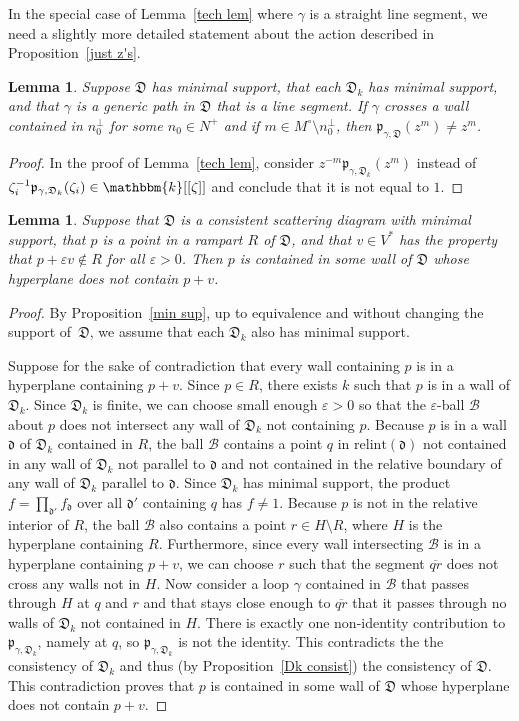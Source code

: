 \documentclass{amsart}
\newtheorem{lemma}[proposition]{Lemma}
\theoremstyle{definition}
\theoremstyle{remark}
\numberwithin{equation}{section}
\newcommand{\ep}{\varepsilon}
\newcommand{\D}{{\mathfrak D}}
\newcommand{\p}{{\mathfrak p}}
\newcommand{\0}{{\mathbf{0}}}
\newcommand{\relint}{\mathrm{relint}}
\renewcommand{\k}{\mathbbm{k}}
\newcommand{\B}{\mathcal{B}}
\renewcommand{\d}{{\mathfrak d}}
\newcommand{\seg}[1]{\overline{#1}}
\begin{document}
In the special case of Lemma~\ref{tech lem} where $\gamma$ is a straight line segment, we need a slightly more detailed statement about the action described in Proposition~\ref{just z's}.
\begin{lemma}\label{tech lem detailed}
Suppose $\D$ has minimal support, that each $\D_k$ has minimal support, and that $\gamma$ is a generic path in $\D$ that is a line segment.
If $\gamma$ crosses a wall contained in $n_0^\perp$ for some $n_0\in N^+$ and if $m\in M^\circ\setminus n_0^\perp$, then $\p_{\gamma,\D}(z^m)\neq z^m$.
\end{lemma}
\begin{proof}
In the proof of Lemma~\ref{tech lem}, consider $z^{-m}\p_{\gamma,\D_k}(z^m)$ instead of $\zeta_i^{-1}\p_{\gamma,\D_k}(\zeta_i)\in \k[[\zeta]]$ and conclude that it is not equal to $1$.
\end{proof}


\begin{lemma}\label{bare point}
Suppose that $\D$ is a consistent scattering diagram with minimal support, that $p$ is a point in a rampart $R$ of $\D$, and that $v\in V^*$ has the property that $p+\ep v\not\in R$ for all $\ep>0$.
Then $p$ is contained in some wall of $\D$ whose hyperplane does not contain $p+v$.
\end{lemma}
\begin{proof}
By Proposition~\ref{min sup}, up to equivalence and without changing the support of~$\D$, we assume that each $\D_k$ also has minimal support.

Suppose for the sake of contradiction that every wall containing $p$ is in a hyperplane containing $p+v$.
Since $p\in R$, there exists $k$ such that $p$ is in a wall of $\D_k$.
Since $\D_k$ is finite, we can choose small enough $\ep>0$ so that the $\ep$-ball $\B$ about $p$ does not intersect any wall of $\D_k$ not containing $p$.
Because $p$ is in a wall $\d$ of $\D_k$ contained in $R$, the ball $\B$ contains a point $q$ in $\relint(\d)$ not contained in any wall of $\D_k$ not parallel to $\d$ and not contained in the relative boundary of any wall of $\D_k$ parallel to $\d$.
Since $\D_k$ has minimal support, the product $f=\prod_{\d'}f_\d$ over all $\d'$ containing $q$ has $f\neq 1$.
Because $p$ is not in the relative interior of $R$, the ball $\B$ also contains a point $r\in H\setminus R$, where $H$ is the hyperplane containing $R$.
Furthermore, since every wall intersecting $\B$ is in a hyperplane containing $p+v$, we can choose $r$ such that the segment $\seg{qr}$ does not cross any walls not in $H$.
Now consider a loop $\gamma$ contained in $\B$ that passes through $H$ at $q$ and $r$ and that stays close enough to $\seg{qr}$ that it passes through no walls of $\D_k$ not contained in $H$.
There is exactly one non-identity contribution to $\p_{\gamma,\D_k}$, namely at $q$, so $\p_{\gamma,\D_k}$ is not the identity.
This contradicts the the consistency of $\D_k$ and thus (by Proposition~\ref{Dk consist}) the consistency of $\D$.
This contradiction proves that $p$ is contained in some wall of $\D$ whose hyperplane does not contain $p+v$.
\end{proof}
\end{document}
